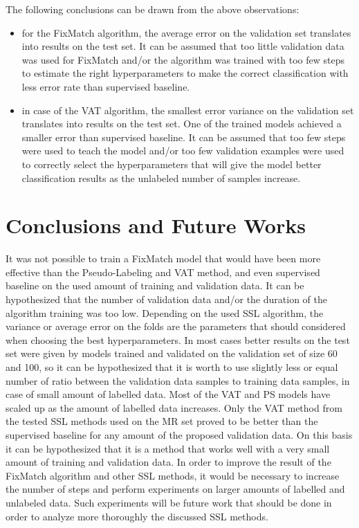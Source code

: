 \documentclass[12pt]{article}
\theoremstyle{definition}
\DeclareRobustCommand{\[}{\begin{equation}}
\DeclareRobustCommand{\]}{\end{equation}}
\begin{document}
\vspace{5mm} %
The following conclusions can be drawn from the above observations:
    \begin{itemize}
        \item for the FixMatch algorithm, the average error on the validation set translates into results on the test set. It can be assumed that too little validation data was used for FixMatch and/or the algorithm was trained with too few steps to estimate the right hyperparameters to make the correct classification with less error rate than supervised baseline.
        \item in case of the VAT algorithm, the smallest error variance on the validation set translates into results on the test set. One of the trained models achieved a smaller error than supervised baseline. It can be assumed that too few steps were used to teach the model and/or too few validation examples were used to correctly select the hyperparameters that will give the model better classification results as the unlabeled number of samples increase.
    \end{itemize}

\section{Conclusions and Future Works}
It was not possible to train a FixMatch model that would have been more effective than the Pseudo-Labeling and VAT method, and even supervised baseline on the used amount of training and validation data. It can be hypothesized that the number of validation data and/or the duration of the algorithm training was too low.
Depending on the used SSL algorithm, the variance or average error on the folds are the parameters that should considered when choosing the best hyperparameters. In most cases better results on the test set were given by models trained and validated on the validation set of size 60 and 100, so it can be hypothesized that it is worth to use slightly less or equal number of ratio between the validation data samples to training data samples, in case of small amount of labelled data.
Most of the VAT and PS models have scaled up as the amount of labelled data increases.
Only the VAT method from the tested SSL methods used on the MR set proved to be better than the supervised baseline for any amount of the proposed validation data. On this basis it can be hypothesized that it is a method that works well with a very small amount of training and validation data.
In order to improve the result of the FixMatch algorithm and other SSL methods, it would be necessary to increase the number of steps and perform experiments on larger amounts of labelled and unlabeled data. Such experiments will be future work that should be done in order to analyze more thoroughly the discussed SSL methods.

\medskip



\end{document}
